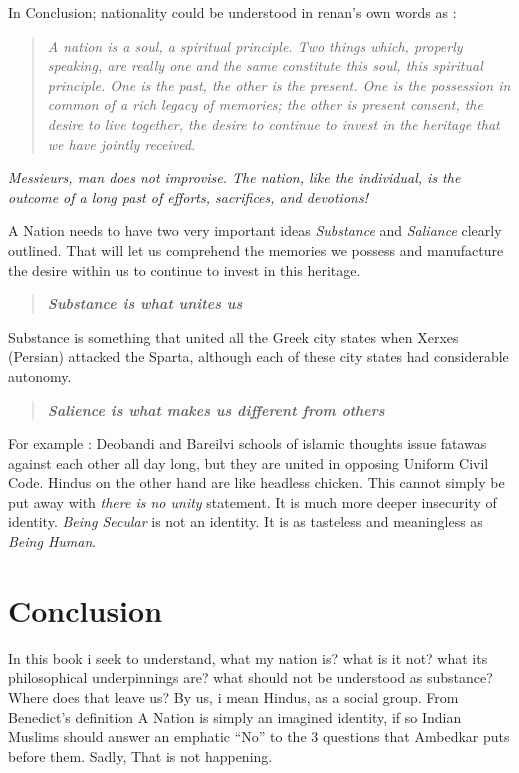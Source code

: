 \documentclass[
]{book}
\begin{document}
In Conclusion; nationality could be understood in renan's own words as :

\begin{quote}
\emph{A nation is a soul, a spiritual principle. Two things which, properly speaking, are really one and the same constitute this soul, this spiritual principle. One is the past, the other is the present. One is the possession in common of a rich legacy of memories; the other is present consent, the desire to live together, the desire to continue to invest in the heritage that we have jointly received.}
\end{quote}

\emph{Messieurs, man does not improvise. The nation, like the individual, is the outcome of a long past of efforts, sacrifices, and devotions!}

A Nation needs to have two very important ideas \emph{\emph{Substance}} and \emph{\emph{Saliance}} clearly outlined. That will let us comprehend the memories we possess and manufacture the desire within us to continue to invest in this heritage.

\begin{quote}
\textbf{\emph{Substance is what unites us}}
\end{quote}

Substance is something that united all the Greek city states when Xerxes (Persian) attacked the Sparta, although each of these city states had considerable autonomy.

\begin{quote}
\textbf{\emph{Salience is what makes us different from others}}
\end{quote}

For example : Deobandi and Bareilvi schools of islamic thoughts issue fatawas against each other all day long, but they are united in opposing Uniform Civil Code. Hindus on the other hand are like headless chicken. This cannot simply be put away with \emph{there is no unity} statement. It is much more deeper insecurity of identity. \emph{Being Secular} is not an identity. It is as tasteless and meaningless as \emph{Being Human}.

\hypertarget{conclusion}{%
\section{Conclusion}\label{conclusion}}

In this book i seek to understand, what my nation is? what is it not? what its philosophical underpinnings are? what should not be understood as substance? Where does that leave us? By us, i mean Hindus, as a social group. From Benedict's definition A Nation is simply an imagined identity, if so Indian Muslims should answer an emphatic ``No'' to the 3 questions that Ambedkar puts before them. Sadly, That is not happening.
\end{document}
